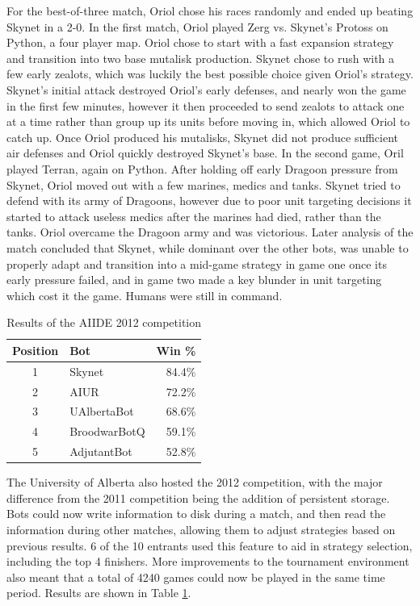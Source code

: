 \documentclass[journal]{IEEEtran}
\begin{document}
For the best-of-three match, Oriol chose his races randomly and ended up beating Skynet in a 2-0. 
In the first match, Oriol played Zerg vs. Skynet's Protoss on Python, a four player map. Oriol chose
to start with a fast expansion strategy and transition into two base mutalisk production. Skynet chose
to rush with a few early zealots, which was luckily the best possible choice given Oriol's strategy.
Skynet's initial attack destroyed Oriol's early defenses, and nearly won the game in the first few
minutes, however it then proceeded to send zealots to attack one at a time rather than group up its
units before moving in, which allowed Oriol to catch up. Once Oriol produced his mutalisks, Skynet did
not produce sufficient air defenses and Oriol quickly destroyed Skynet's base. In the second game,
Oril played Terran, again on Python. After holding off early Dragoon pressure from Skynet, Oriol
moved out with a few marines, medics and tanks. Skynet tried to defend with its army of Dragoons,
however due to poor unit targeting decisions it started to attack useless medics after the marines
had died, rather than the tanks. Oriol overcame the Dragoon army and was victorious. Later analysis
of the match concluded that Skynet, while dominant over the other bots, was unable to properly
adapt and transition into a mid-game strategy in game one once its early pressure failed, and in game
two made a key blunder in unit targeting which cost it the game. Humans were still in command.

\begin{table}[!t]
\caption{Results of the AIIDE 2012 competition}
\label{tab:aiide2012}
\centering
\begin{tabular}{|c|l|r|}
\hline
{\bfseries Position} & {\bfseries Bot} & {\bfseries Win \%} \\
\hline
1 & Skynet & 84.4\% \\
2 & AIUR & 72.2\% \\
3 & UAlbertaBot & 68.6\% \\
4 & BroodwarBotQ & 59.1\% \\
5 & AdjutantBot & 52.8\% \\
\hline
\end{tabular}
\end{table}

The University of Alberta also hosted the 2012 competition, with the major difference from the 2011
competition being the addition of persistent storage. Bots could now write information to disk during a
match, and then read the information during other matches, allowing them to adjust strategies based
on previous results. 6 of the 10 entrants used this feature to aid in strategy selection, including the
top 4 finishers. More improvements to the tournament environment also meant that a total of 4240 games
could now be played in the same time period. Results are shown in Table \ref{tab:aiide2012}.
\end{document}
